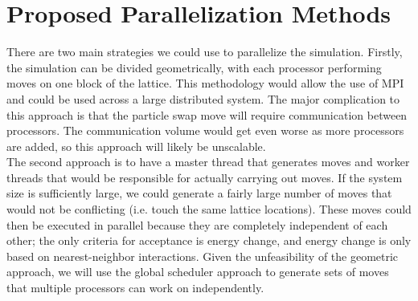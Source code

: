 \documentclass{article}
\begin{document}
\section*{Proposed Parallelization Methods}
There are two main strategies we could use to parallelize the simulation. Firstly, the simulation can be divided geometrically, with each processor performing moves on one block of the lattice. This methodology would allow the use of MPI and could be used across a large distributed system. The major complication to this approach is that the particle swap move will require communication between processors. The communication volume would get even worse as more processors are added, so this approach will likely be unscalable.\\
The second approach is to have a master thread that generates moves and worker threads that would be responsible for actually carrying out moves. If the system size is sufficiently large, we could generate a fairly large number of moves that would not be conflicting (i.e. touch the same lattice locations). These moves could then be executed in parallel because they are completely independent of each other; the only criteria for acceptance is energy change, and energy change is only based on nearest-neighbor interactions. Given the unfeasibility of the geometric approach, we will use the global scheduler approach to generate sets of moves that multiple processors can work on independently.
\end{document}
